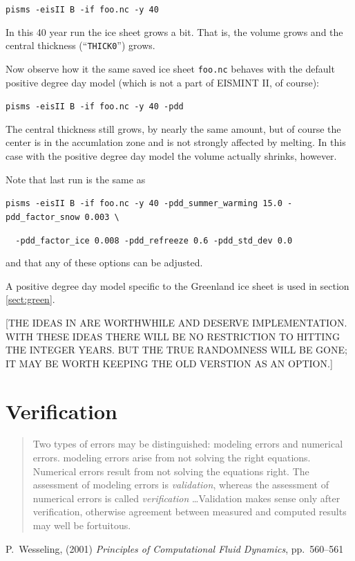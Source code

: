\documentclass[11pt,final]{amsart}
\begin{document}
\verb|pisms -eisII B -if foo.nc -y 40|

\noindent In this 40 year run the ice sheet grows a bit.  That is, the volume grows and the central thickness (``\verb|THICK0|'') grows.  

Now observe how it the same saved ice sheet \verb|foo.nc| behaves with the default positive degree day model (which is not a part of EISMINT II, of course):

\verb|pisms -eisII B -if foo.nc -y 40 -pdd|

\noindent The central thickness still grows, by nearly the same amount, but of course the center is in the accumlation zone and is not strongly affected by melting.  In this case with the positive degree day model the volume actually shrinks, however.

Note that last run is the same as

\verb|pisms -eisII B -if foo.nc -y 40 -pdd_summer_warming 15.0 -pdd_factor_snow 0.003 \|

\verb|  -pdd_factor_ice 0.008 -pdd_refreeze 0.6 -pdd_std_dev 0.0|

\noindent and that any of these options can be adjusted.

A positive degree day model specific to the Greenland ice sheet is used in section \ref{sect:green}.

[THE IDEAS IN \cite{CalovGreve05} ARE WORTHWHILE AND DESERVE IMPLEMENTATION.  WITH THESE IDEAS THERE WILL BE NO RESTRICTION TO HITTING THE INTEGER YEARS.  BUT THE TRUE RANDOMNESS WILL BE GONE; IT MAY BE WORTH KEEPING THE OLD VERSTION AS AN OPTION.]


\clearpage\newpage
\section{Verification}\label{sect:verif}

\bigskip
\begin{quote}  Two types of errors may be distinguished: modeling errors and numerical errors.  modeling errors arise from not solving the right equations.  Numerical errors result from not solving the equations right.  The assessment of modeling errors is \emph{validation}, whereas the assessment of numerical errors is called \emph{verification} \dots  Validation makes sense only after verification, otherwise agreement between measured and computed results may well be fortuitous.
\end{quote}
\hfill P.~Wesseling, (2001)  \emph{Principles of Computational Fluid Dynamics}, pp.~560--561 \cite{Wesseling}
\bigskip
\end{document}
